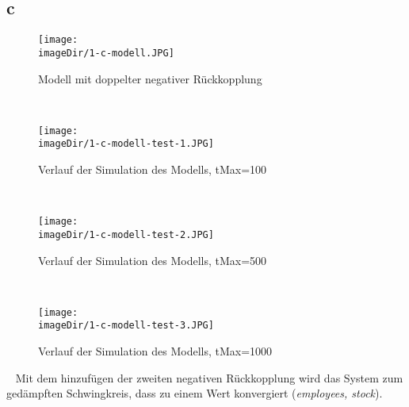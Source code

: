 \subsection{c}
\begin{figure}[h]
	\centering
	\texttt{[image: \\imageDir/1-c-modell.JPG]}
	\caption{Modell mit doppelter negativer Rückkopplung}
	\label{fig:1-c-modell}
\end{figure}
\ \newpage

\begin{figure}[h]
	\centering
	\texttt{[image: \\imageDir/1-c-modell-test-1.JPG]}
	\caption{Verlauf der Simulation des Modells, tMax=100}
	\label{fig:1-c-modell-test-1}
\end{figure}
\ \newpage

\begin{figure}[h]
	\centering
	\texttt{[image: \\imageDir/1-c-modell-test-2.JPG]}
	\caption{Verlauf der Simulation des Modells, tMax=500}
	\label{fig:1-c-modell-test-2}
\end{figure}
\ \newpage

\begin{figure}[h]
\centering
\texttt{[image: \\imageDir/1-c-modell-test-3.JPG]}
\caption{Verlauf der Simulation des Modells, tMax=1000}
\label{fig:1-c-modell-test-3}
\end{figure}
\ \newline
Mit dem hinzufügen der zweiten negativen Rückkopplung wird das System zum gedämpften Schwingkreis, dass zu einem Wert konvergiert (\emph{employees, stock}).
\newpage

